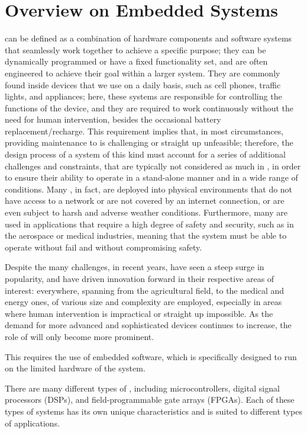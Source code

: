 \section{Overview on Embedded Systems}
\ess can be defined as a combination of hardware components and software systems that seamlessly work together to achieve a specific purpose; they can be dynamically programmed or have a fixed functionality set, and are often engineered to achieve their goal within a larger system. They are commonly found inside devices that we use on a daily basis, such as cell phones, traffic lights, and appliances; here, these systems are responsible for controlling the functions of the device, and they are required to work continuously without the need for human intervention, besides the occasional battery replacement/recharge.
This requirement implies that, in most circumstances, providing maintenance to \ess is challenging or straight up unfeasible; therefore, the design process of a system of this kind must account for a series of additional challenges and constraints, that are typically not considered as much in \noess, in order to ensure their ability to operate in a stand-alone manner and in a wide range of conditions. Many \ess, in fact, are deployed into physical environments that do not have access to a network or are not covered by an internet connection, or are even subject to harsh and adverse weather conditions.
Furthermore, many \ess are used in applications that require a high degree of safety and security, such as in the aerospace or medical industries, meaning that the system must be able to operate without fail and without compromising safety. 

Despite the many challenges, in recent years, \ess have seen a steep surge in popularity, and have driven innovation forward in their respective areas of interest: everywhere, spanning from the agricultural field, to the medical and energy ones, \ess of various size and complexity are employed, especially in areas where human intervention is impractical or straight up impossible.
As the demand for more advanced and sophisticated devices continues to increase, the role of \ess will only become more prominent.



This requires the use of embedded software, which is specifically designed to run on the limited hardware of the system.

There are many different types of \ess, including microcontrollers, digital signal processors (DSPs), and field-programmable gate arrays (FPGAs). Each of these types of systems has its own unique characteristics and is suited to different types of applications.


